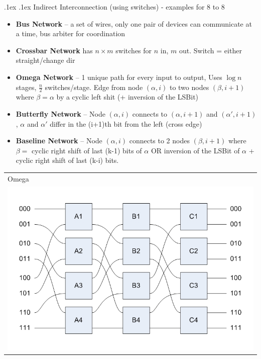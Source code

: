 \documentclass[10pt,landscape,a4paper]{article}
\makeatletter
\renewcommand{\subsubsection}{\@startsection{subsubsection}{1}{0mm}%
  {.1ex}%
  {.1ex}%
{\rmfamily\bfseries}}
\makeatother
\begin{document}
\begin{multicols*}{4}
  \subsubsection{Indirect Interconnection (using switches) - examples for 8 to 8}
  \begin{itemize}
    \item \textbf{Bus Network} -- a set of wires, only one pair of devices can communicate at a time, bus arbiter for coordination
    \item \textbf{Crossbar Network} has $n\times m$ switches for $n$ in, $m$ out. Switch = either straight/change dir
    \item \textbf{Omega Network} -- 1 unique path for every input to output, Uses $\log n$ stages, $\frac{n}{2}$ switches/stage. Edge from node $(\alpha, i)$ to two nodes $(\beta, i + 1)$ where $\beta = \alpha$ by a cyclic left shit (+ inversion of the LSBit)
    \item \textbf{Butterfly Network} -- Node $(\alpha, i)$ connects to $(\alpha, i + 1)$ and $(\alpha', i + 1)$, $\alpha$ and $\alpha'$ differ in the (i+1)th bit from the left (cross edge)
    \item \textbf{Baseline Network} -- Node $(\alpha, i)$ connects to 2 nodes $(\beta, i + 1)$ where $\beta = $ cyclic right shift of last (k-1) bits of $\alpha$ OR inversion of the LSBit of $\alpha$ + cyclic right shift of last (k-i) bits.
  \end{itemize}
  \begin{tabularx}{0.35\linewidth}{X}
    Omega \\
    \includegraphics[width=\linewidth]{omega}
  \end{tabularx}
  \begin{tabularx}{0.3\linewidth}{X}

\end{tabularx}
\end{multicols*}
\end{document}

